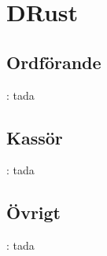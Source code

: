 \section{DRust}
\subsection{Ordförande}
\begin{frame}{\secname: \subsecname}
tada
\end{frame}

\subsection{Kassör}
\begin{frame}{\secname: \subsecname}
tada
\end{frame}

\subsection{Övrigt}
\begin{frame}{\secname: \subsecname}
tada
\end{frame}